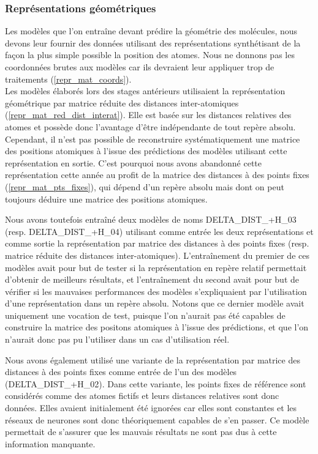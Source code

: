 \label{delta_dist_donnees}

\subsubsection{Représentations géométriques}
\par Les modèles que l'on entraîne devant prédire la géométrie des molécules, nous devons leur fournir des données utilisant des représentations synthétisant de la façon la plus simple possible la position des atomes. Nous ne donnons pas les coordonnées brutes aux modèles car ils devraient leur appliquer trop de traitements (\ref{repr_mat_coords}).\\
Les modèles élaborés lors des stages antérieurs utilisaient la représentation géométrique par matrice réduite des distances inter-atomiques (\ref{repr_mat_red_dist_interat}). Elle est basée sur les distances relatives des atomes et possède donc l'avantage d'être indépendante de tout repère absolu. Cependant, il n'est pas possible de reconstruire systématiquement une matrice des positions atomiques à l'issue des prédictions des modèles utilisant cette représentation en sortie. C'est pourquoi nous avons abandonné cette représentation cette année au profit de la matrice des distances à des points fixes (\ref{repr_mat_pts_fixes}), qui dépend d'un repère absolu mais dont on peut toujours déduire une matrice des positions atomiques.\\

\par Nous avons toutefois entraîné deux modèles de noms DELTA\_DIST\_+H\_03 (resp. DELTA\_DIST\_+H\_04) utilisant comme entrée les deux représentations et comme sortie la représentation par matrice des distances à des points fixes (resp. matrice réduite des distances inter-atomiques). L'entraînement du premier de ces modèles avait pour but de tester si la représentation en repère relatif permettait d'obtenir de meilleurs résultats, et l'entraînement du second avait pour but de vérifier si les mauvaises performances des modèles s'expliquaient par l'utilisation d'une représentation dans un repère absolu. Notons que ce dernier modèle avait uniquement une vocation de test, puisque l'on n'aurait pas été capables de construire la matrice des positons atomiques à l'issue des prédictions, et que l'on n'aurait donc pas pu l'utiliser dans un cas d'utilisation réel.\\

\par Nous avons également utilisé une variante de la représentation par matrice des distances à des points fixes comme entrée de l'un des modèles (DELTA\_DIST\_+H\_02). Dans cette variante, les points fixes de référence sont considérés comme des atomes fictifs et leurs distances relatives sont donc données. Elles avaient initialement été ignorées car elles sont constantes et les réseaux de neurones sont donc théoriquement capables de s'en passer. Ce modèle permettait de s'assurer que les mauvais résultats ne sont pas dus à cette information manquante.

